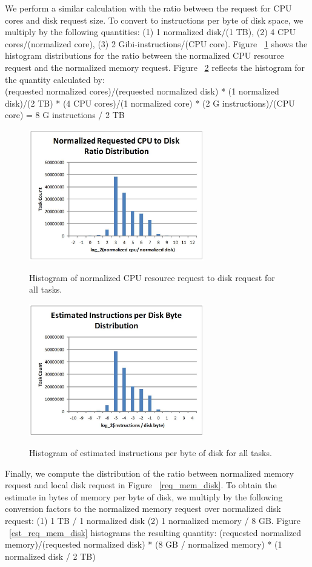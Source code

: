 \documentclass{sig-alternate}
\begin{document}
We perform a similar calculation with the ratio between the request for CPU cores and disk request size.
To convert to instructions per byte of disk space, we multiply by the following quantities: (1) 1 normalized disk/(1 TB), (2) 4 CPU cores/(normalized core), (3) 2 Gibi-instructions/(CPU core).
Figure ~\ref{req_cpu_disk} shows the histogram distributions for the ratio between the normalized CPU resource request and the normalized memory request.
Figure ~\ref{est_req_cpu_disk} reflects the histogram for the quantity calculated by: \\
(requested normalized cores)/(requested normalized disk) * (1 normalized disk)/(2 TB) * (4 CPU cores)/(1 normalized core) * (2 G instructions)/(CPU core) = 8 G instructions / 2 TB

\begin{figure}
\centering
\includegraphics[width=3in]{../figures/req_cpu_disk.jpg}
\label{req_cpu_disk}
\caption{Histogram of normalized CPU resource request to disk request for all tasks.}
\end{figure}

\begin{figure}
\centering
\includegraphics[width=3in]{../figures/est_req_cpu_disk.jpg}
\label{est_req_cpu_disk}
\caption{Histogram of estimated instructions per byte of disk for all tasks.}
\end{figure}

Finally, we compute the distribution of the ratio between normalized memory request and local disk request in Figure ~\ref{req_mem_disk}.
To obtain the estimate in bytes of memory per byte of disk, we multiply by the following conversion factors to the normalized memory request over normalized disk request: (1) 1 TB / 1 normalized disk (2) 1 normalized memory / 8 GB.
Figure ~\ref{est_req_mem_disk} histograms the resulting quantity:
(requested normalized memory)/(requested normalized disk) * (8 GB / normalized memory) * (1 normalized disk / 2 TB)
\end{document}
